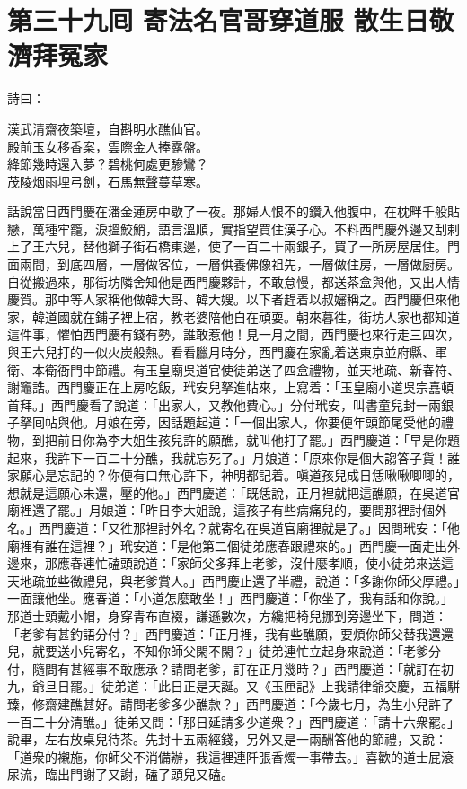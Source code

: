 
\chapter*{第三十九囘 寄法名官哥穿道服 散生日敬濟拜冤家}


詩曰：

\begin{myquote}
漢武清齋夜築壇，自斟明水醮仙官。\\殿前玉女移香案，雲際金人捧露盤。\\絳節幾時還入夢？碧桃何處更驂鸞？\\茂陵烟雨埋弓劍，石馬無聲蔓草寒。
\end{myquote}

話說當日西門慶在潘金蓮房中歇了一夜。那婦人恨不的鑽入他腹中，在枕畔千般貼戀，萬種牢籠，淚搵鮫鮹，語言溫順，實指望買住漢子心。不料西門慶外邊又刮剌上了王六兒，替他獅子街石橋東邊，使了一百二十兩銀子，買了一所房屋居住。門面兩間，到底四層，一層做客位，一層供養佛像祖先，一層做住房，一層做廚房。自從搬過來，那街坊隣舍知他是西門慶夥計，不敢怠慢，都送茶盒與他，又出人情慶賀。那中等人家稱他做韓大哥、韓大嫂。以下者趕着以叔嬸稱之。西門慶但來他家，韓道國就在鋪子裡上宿，教老婆陪他自在頑耍。朝來暮徃，街坊人家也都知道這件事，懼怕西門慶有錢有勢，誰敢惹他！見一月之間，西門慶也來行走三四次，與王六兒打的一似火炭般熱。看看臘月時分，西門慶在家亂着送東京並府縣、軍衛、本衛衙門中節禮。有玉皇廟吳道官使徒弟送了四盒禮物，並天地疏、新春符、謝竈誥。西門慶正在上房吃飯，玳安兒拏進帖來，上寫着：「玉皇廟小道吳宗嚞頓首拜。」西門慶看了說道：「出家人，又教他費心。」分付玳安，叫書童兒封一兩銀子拏囘帖與他。月娘在旁，因話題起道：「一個出家人，你要便年頭節尾受他的禮物，到把前日你為李大姐生孩兒許的願醮，就叫他打了罷。」西門慶道：「早是你題起來，我許下一百二十分醮，我就忘死了。」月娘道：「原來你是個大謅答子貨！誰家願心是忘記的？你便有口無心許下，神明都記着。嗔道孩兒成日恁啾啾唧唧的，想就是這願心未還，壓的他。」{}西門慶道：「既恁說，正月裡就把這醮願，在吳道官廟裡還了罷。」月娘道：「昨日李大姐說，這孩子有些病痛兒的，要問那裡討個外名。」西門慶道：「又徃那裡討外名？就寄名在吳道官廟裡就是了。」因問玳安：「他廟裡有誰在這裡？」玳安道：「是他第二個徒弟應春跟禮來的。」西門慶一面走出外邊來，那應春連忙磕頭說道：「家師父多拜上老爹，沒什麼孝順，使小徒弟來送這天地疏並些微禮兒，與老爹賞人。」西門慶止還了半禮，說道：「多謝你師父厚禮。」一面讓他坐。應春道：「小道怎麼敢坐！」西門慶道：「你坐了，我有話和你說。」那道士頭戴小帽，身穿青布直裰，謙遜數次，方纔把椅兒挪到旁邊坐下，問道：「老爹有甚釣語分付？」西門慶道：「正月裡，我有些醮願，要煩你師父替我還還兒，就要送小兒寄名，不知你師父閑不閑？」徒弟連忙立起身來說道：「老爹分付，隨問有甚經事不敢應承？請問老爹，訂在正月幾時？」西門慶道：「就訂在初九，爺旦日罷。」徒弟道：「此日正是天誕。又《玉匣記》上我請律爺交慶，五福駢臻，修齋建醮甚好。請問老爹多少醮款？」西門慶道：「今歲七月，為生小兒許了一百二十分清醮。」徒弟又問：「那日延請多少道衆？」西門慶道：「請十六衆罷。」說畢，左右放桌兒待茶。先封十五兩經錢，另外又是一兩酬答他的節禮，又說：「道衆的襯施，你師父不消備辦，我這裡連阡張香燭一事帶去。」喜歡的道士屁滾尿流，臨出門謝了又謝，磕了頭兒又磕。

